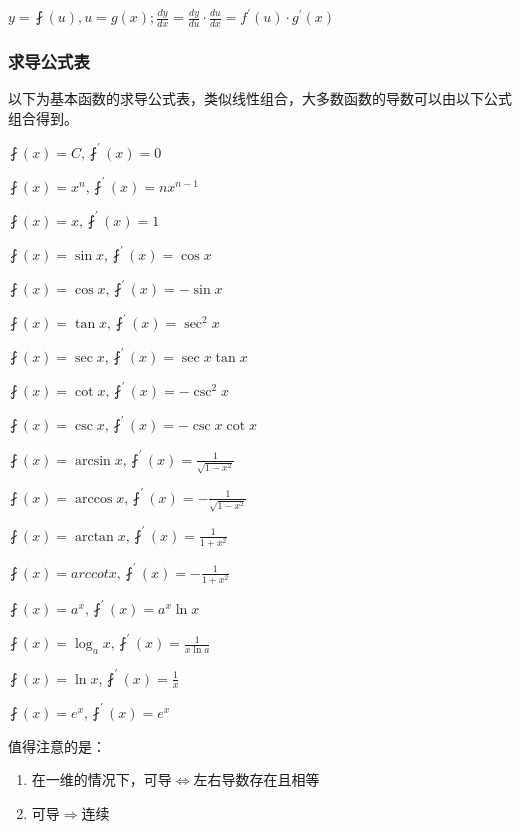 \documentclass[UTF8]{ctexbook}
\newcommand{\derivative}{^\prime}
\newcommand{\myLeftRightArrow}{$\Leftrightarrow$}
\newcommand{\myRightArrow}{$\Rightarrow$}
\begin{document}
{{{{    $y = \fint(u), u = g(x); \frac{dy}{dx} = \frac{dy}{du} \cdot \frac{du}{dx} = f\derivative(u) \cdot g\derivative(x)$
  }%

  \subsubsection{求导公式表}{
    以下为基本函数的求导公式表，类似线性组合，大多数函数的导数可以由以下公式组合得到。

    $\fint(x) = C, \fint\derivative(x) = 0$

    $\fint(x) = x^n, \fint\derivative(x) = nx^{n-1}$

    $\fint(x) = x, \fint\derivative(x) = 1$

    $\fint(x) = \sin x, \fint\derivative(x) = \cos x$

    $\fint(x) = \cos x, \fint\derivative(x) = -\sin x$

    $\fint(x) = \tan x, \fint\derivative(x) = \sec^2 x$

    $\fint(x) = \sec x, \fint\derivative(x) = \sec x\tan x$

    $\fint(x) = \cot x, \fint\derivative(x) = -\csc^2 x$

    $\fint(x) = \csc x, \fint\derivative(x) = -\csc x\cot x$

    $\fint(x) = \arcsin x, \fint\derivative(x) = \frac{1}{\sqrt{1 - x^2}}$

    $\fint(x) = \arccos x, \fint\derivative(x) = -\frac{1}{\sqrt{1 - x^2}}$

    $\fint(x) = \arctan x, \fint\derivative(x) = \frac{1}{1 + x^2}$

    $\fint(x) = arccotx, \fint\derivative(x) = -\frac{1}{1 + x^2}$

    $\fint(x) = a^x, \fint\derivative(x) = a^x\ln x$

    $\fint(x) = \log_a x, \fint\derivative(x) = \frac{1}{x\ln a}$

    $\fint(x) = \ln x, \fint\derivative(x)= \frac{1}{x}$

    $\fint(x) = e^x, \fint\derivative(x) = e^x$
  }%
  \newline

  值得注意的是：
  \begin{enumerate}
    \item 在一维的情况下，可导\myLeftRightArrow 左右导数存在且相等

    \item 可导\myRightArrow 连续


\end{enumerate}}}}
\end{document}
